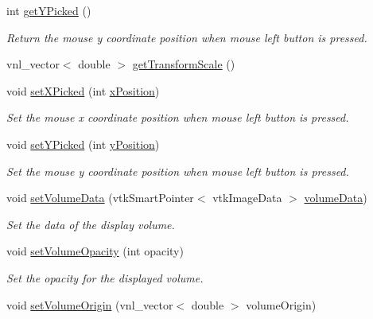 \begin{DoxyCompactItemize}
int \hyperlink{class_q_v_t_k_image_widget_a9bb1f5c8af59046c632ce4401c14999b}{get\-Y\-Picked} ()
\begin{DoxyCompactList}\small\item\em Return the mouse y coordinate position when mouse left button is pressed. \end{DoxyCompactList}\item 
vnl\-\_\-vector$<$ double $>$ \hyperlink{class_q_v_t_k_image_widget_a2ca7eefa37af83c21253b2d820d106b6}{get\-Transform\-Scale} ()
\item 
void \hyperlink{class_q_v_t_k_image_widget_a088f422bce686308654f8c0899c1780f}{set\-X\-Picked} (int \hyperlink{class_q_v_t_k_image_widget_afd88ea5dbed175232b0c15cbe4cdca89}{x\-Position})
\begin{DoxyCompactList}\small\item\em Set the mouse x coordinate position when mouse left button is pressed. \end{DoxyCompactList}\item 
void \hyperlink{class_q_v_t_k_image_widget_a33c482cc6629c52762f27649e39f6006}{set\-Y\-Picked} (int \hyperlink{class_q_v_t_k_image_widget_a6724caff3a614db8321deaa70532255c}{y\-Position})
\begin{DoxyCompactList}\small\item\em Set the mouse y coordinate position when mouse left button is pressed. \end{DoxyCompactList}\item 
void \hyperlink{class_q_v_t_k_image_widget_aef9c08064cc4c9c854a083bd3fb3354f}{set\-Volume\-Data} (vtk\-Smart\-Pointer$<$ vtk\-Image\-Data $>$ \hyperlink{class_q_v_t_k_image_widget_a5e2dcad8b7ea1a85c4b8052e9452844c}{volume\-Data})
\begin{DoxyCompactList}\small\item\em Set the data of the display volume. \end{DoxyCompactList}\item 
void \hyperlink{class_q_v_t_k_image_widget_a3ffaadb9dfa3b4f12e1076eaed9b617e}{set\-Volume\-Opacity} (int opacity)
\begin{DoxyCompactList}\small\item\em Set the opacity for the displayed volume. \end{DoxyCompactList}\item 
void \hyperlink{class_q_v_t_k_image_widget_adb0713deec444a097e8624de90a84bb1}{set\-Volume\-Origin} (vnl\-\_\-vector$<$ double $>$ volume\-Origin)
\item 

\end{DoxyCompactItemize}
